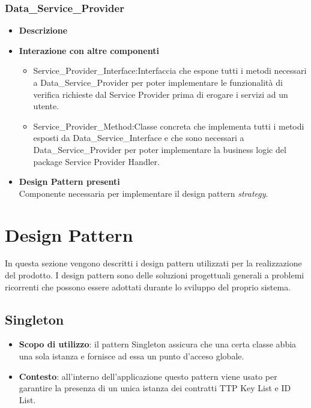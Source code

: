 \subsubsection{Data\_Service\_Provider}
\begin{itemize}
	\item \textbf{Descrizione}
	\item \textbf{Interazione con altre componenti}
	\begin{itemize}
		\item Service\_Provider\_Interface:Interfaccia che espone tutti i metodi necessari a Data\_Service\_Provider per poter implementare le funzionalità di verifica richieste dal Service Provider prima di erogare i servizi ad un utente.
		\item Service\_Provider\_Method:Classe concreta che implementa tutti i metodi esposti da Data\_Service\_Interface e che sono necessari a Data\_Service\_Provider per poter implementare la business logic del package Service Provider Handler.
	\end{itemize}
	\item \textbf{Design Pattern presenti}\\
	Componente necessaria per implementare il design pattern \textit{strategy}.
\end{itemize}
\section{Design Pattern}
In questa sezione vengono descritti i design pattern utilizzati per la realizzazione del prodotto. I design pattern sono delle soluzioni progettuali generali a problemi ricorrenti che possono essere adottati durante lo sviluppo del proprio sistema.
\subsection{Singleton}
\begin{itemize}
	\item \textbf{Scopo di utilizzo}: il pattern Singleton assicura che una certa classe abbia una sola istanza e fornisce ad essa un punto d’acceso globale.
	\item \textbf{Contesto}: all'interno dell’applicazione questo pattern viene usato per garantire la presenza di un unica istanza dei contratti TTP Key List e ID List.
\end{itemize}
